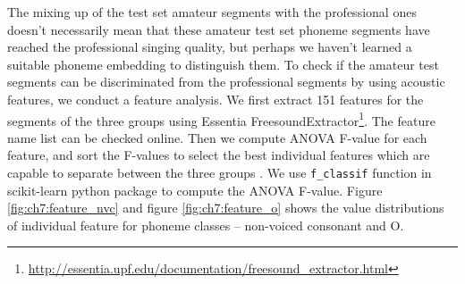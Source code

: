 The mixing up of the test set amateur segments with the professional ones doesn't necessarily mean that these amateur test set phoneme segments have reached the professional singing quality, but perhaps we haven't learned a suitable phoneme embedding to distinguish them. To check if the amateur test segments can be discriminated from the professional segments by using acoustic features, we conduct a feature analysis. We first extract 151 features for the segments of the three groups using Essentia FreesoundExtractor\footnote{\url{http://essentia.upf.edu/documentation/freesound\_extractor.html}\label{foot:freesound}}. The feature name list can be checked online.
Then we compute ANOVA F-value for each feature, and sort the F-values to select the best individual features which are capable to separate between the three groups \cite{Stollera}. We use \texttt{f\_classif} function in scikit-learn python package to compute the ANOVA F-value. Figure \ref{fig:ch7:feature_nvc} and figure \ref{fig:ch7:feature_o} shows the value distributions of individual feature for phoneme classes -- non-voiced consonant and O. 

